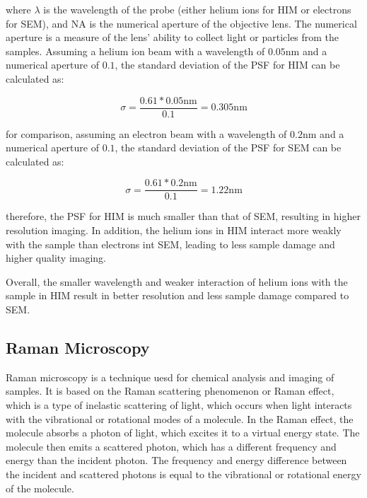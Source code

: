 where $\lambda$ is the wavelength of the probe (either helium ions for HIM or electrons for SEM), and NA is the numerical aperture of the objective lens. The numerical aperture is a measure of the lens' ability to collect light or particles from the samples. Assuming a helium ion beam with a wavelength of $0.05\si{\nano\metre}$ and a numerical aperture of $0.1$, the standard deviation of the PSF for HIM can be calculated as:

\begin{equation}
    \sigma = \frac{0.61*0.05 \si{\nano\metre}}{0.1} = 0.305 \si{\nano\metre}
    \label{eq:PSF_HIM_standard_deviation}
\end{equation}

for comparison, assuming an electron beam with a wavelength of $0.2\si{\nano\metre}$ and a numerical aperture of $0.1$, the standard deviation of the PSF for SEM can be calculated as:

\begin{equation}
    \sigma = \frac{0.61*0.2\si{\nano\metre}}{0.1} = 1.22 \si{\nano\metre}
    \label{eq:PSF_SEM_standard_deviation}
\end{equation}

therefore, the PSF for HIM is much smaller than that of SEM, resulting in higher resolution imaging. In addition, the helium ions in HIM interact more weakly with the sample than electrons int SEM, leading to less sample damage and higher quality imaging.

Overall, the smaller wavelength and weaker interaction of helium ions with the sample in HIM result in better resolution and less sample damage compared to SEM.
\subsection{Raman Microscopy}
\label{subsec:raman_microscopy}
Raman microscopy is a technique uesd for chemical analysis and imaging of samples. It is based on the Raman scattering phenomenon or Raman effect, which is a type of inelastic scattering of light, which occurs when light interacts with the vibrational or rotational modes of a molecule. In the Raman effect, the molecule absorbs a photon of light, which excites it to a virtual energy state. The molecule then emits a scattered photon, which has a different frequency and energy than the incident photon. The frequency and energy difference between the incident and scattered photons is equal to the vibrational or rotational energy of the molecule. 

